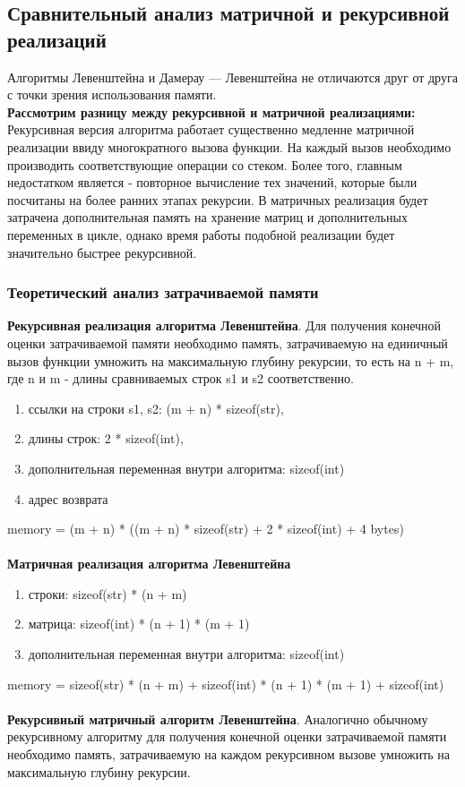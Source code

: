\documentclass[12pt,a4paper]{article}
\begin{document}
\subsection{Сравнительный анализ матричной и рекурсивной реализаций}
\qquad Алгоритмы Левенштейна и Дамерау — Левенштейна не отличаются друг от друга с точки зрения использования памяти.\\
\qquad \textbf{Рассмотрим разницу между рекурсивной и матричной реализациями:}\\
Рекурсивная версия алгоритма работает существенно медленне матричной реализации ввиду многократного вызова функции. На каждый вызов необходимо производить соответствующие операции со стеком. Более того, главным недостатком является - повторное вычисление тех значений, которые были посчитаны на более ранних этапах рекурсии. В матричных реализация будет затрачена дополнительная память на хранение матриц и дополнительных переменных в цикле, однако время работы подобной реализации будет значительно быстрее рекурсивной.
\subsubsection{Теоретический анализ затрачиваемой памяти}
\textbf{Рекурсивная реализация алгоритма Левенштейна}. Для получения конечной оценки затрачиваемой памяти необходимо память, затрачиваемую на единичный вызов функции умножить на максимальную глубину рекурсии, то есть на n + m, где n и m - длины сравниваемых строк s1 и s2 соответственно.
\begin{enumerate}
	\item ссылки на строки s1, s2: (m + n) * sizeof(str),
	\item длины строк: 2 * sizeof(int),
	\item дополнительная переменная внутри алгоритма: sizeof(int)
	\item адрес возврата
\end{enumerate}
memory = (m + n) * ((m + n) * sizeof(str) + 2 * sizeof(int) + 4 bytes)
\\\\
\textbf{Матричная реализация алгоритма Левенштейна}
\begin{enumerate}
	\item строки: sizeof(str) * (n + m)
	\item матрица: sizeof(int) * (n + 1) * (m + 1)
	\item дополнительная переменная внутри алгоритма: sizeof(int)
\end{enumerate}
memory = sizeof(str) * (n + m) + sizeof(int) * (n + 1) * (m + 1) + sizeof(int)
\\\\
\textbf{Рекурсивный матричный алгоритм Левенштейна}. Аналогично обычному рекурсивному алгоритму для получения конечной оценки затрачиваемой памяти необходимо память, затрачиваемую на каждом рекурсивном вызове умножить на максимальную глубину рекурсии.
\end{document}

